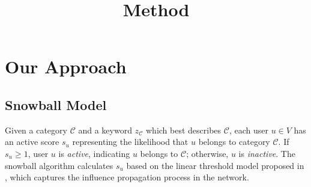 \documentclass{article}
\begin{document}
\title{Method}

\newcommand{\following}{\ensuremath{following}}
\newcommand{\follower}{\ensuremath{follower}}

\maketitle \else \fi

\newcommand{\argmax}{\operatornamewithlimits{argmax}}

\section{Our Approach}\label{sec:method}

\subsection{Snowball Model}

Given a category $\mathcal{C}$ and a keyword $z_{\mathcal{C}}$ which best describes $\mathcal{C}$, each user $u \in V$ has an active score $s_u$ representing the likelihood that $u$ belongs to category $\mathcal{C}$. If $s_u \geq 1$, user $u$ is \emph{active}, indicating $u$ belongs to $\mathcal{C}$; otherwise, $u$ is \emph{inactive}. The snowball algorithm calculates $s_u$ based on the linear threshold model proposed in \cite{snowball1,snowball2}, which captures the influence propagation process in the network.


\end{document}
